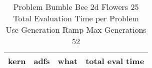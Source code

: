 \begin{table}[H]
\caption{Problem  Bumble Bee 2d  Flowers 25\\Total Evaluation Time per Problem \\ Use Generation Ramp  Max Generations 52\\}
\begin{center}
\scalebox{1.0} %
{
\begin{tabular}{lllr}
\hline
kern & adfs & what & total eval time \\
\hline


\end{tabular}
}
\end{center}
\end{table}

